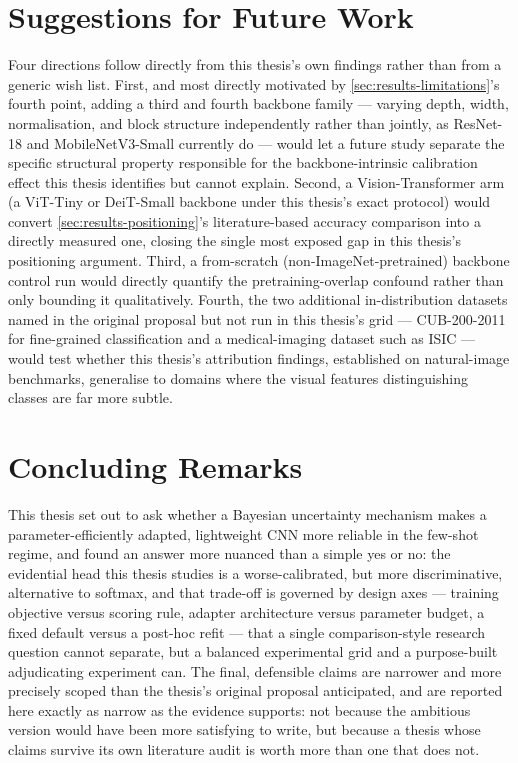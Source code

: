 \documentclass{iutbscthesis}
\begin{document}
\section{Suggestions for Future Work}

Four directions follow directly from this thesis's own findings rather than from a generic wish list. First, and most directly motivated by \autoref{sec:results-limitations}'s fourth point, adding a third and fourth backbone family — varying depth, width, normalisation, and block structure independently rather than jointly, as ResNet-18 and MobileNetV3-Small currently do — would let a future study separate the specific structural property responsible for the backbone-intrinsic calibration effect this thesis identifies but cannot explain. Second, a Vision-Transformer arm (a ViT-Tiny or DeiT-Small backbone under this thesis's exact protocol) would convert \autoref{sec:results-positioning}'s literature-based accuracy comparison into a directly measured one, closing the single most exposed gap in this thesis's positioning argument. Third, a from-scratch (non-ImageNet-pretrained) backbone control run would directly quantify the pretraining-overlap confound rather than only bounding it qualitatively. Fourth, the two additional in-distribution datasets named in the original proposal but not run in this thesis's grid — CUB-200-2011 for fine-grained classification and a medical-imaging dataset such as ISIC — would test whether this thesis's attribution findings, established on natural-image benchmarks, generalise to domains where the visual features distinguishing classes are far more subtle.

\section{Concluding Remarks}

This thesis set out to ask whether a Bayesian uncertainty mechanism makes a parameter-efficiently adapted, lightweight CNN more reliable in the few-shot regime, and found an answer more nuanced than a simple yes or no: the evidential head this thesis studies is a worse-calibrated, but more discriminative, alternative to softmax, and that trade-off is governed by design axes — training objective versus scoring rule, adapter architecture versus parameter budget, a fixed default versus a post-hoc refit — that a single comparison-style research question cannot separate, but a balanced experimental grid and a purpose-built adjudicating experiment can. The final, defensible claims are narrower and more precisely scoped than the thesis's original proposal anticipated, and are reported here exactly as narrow as the evidence supports: not because the ambitious version would have been more satisfying to write, but because a thesis whose claims survive its own literature audit is worth more than one that does not.
\end{document}
